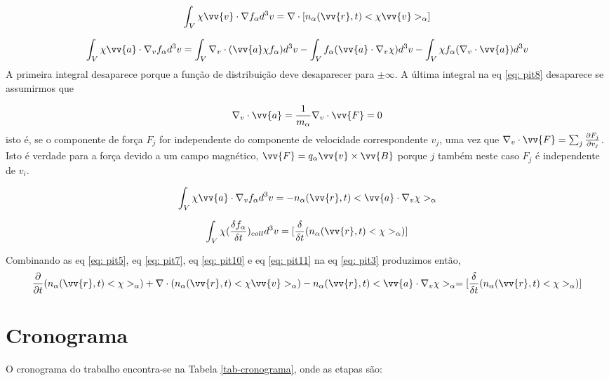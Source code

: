 \documentclass[12pt,oneside,a4paper]{abntex2}
\theoremstyle{definition}  %
\begin{document}
\begin{equation}
\label{eq: pit7}
\int_V \chi \vv{v} \cdot \nabla f_\alpha d^3 v = \nabla \cdot [n_\alpha(\vv{r},t)<\chi \vv{v}>_\alpha]
\end{equation}

\begin{equation}
\label{eq: pit8}
\int_V \chi \vv{a} \cdot \nabla_v f_\alpha d^3 v = \int_V \nabla_v \cdot (\vv{a} \chi f_\alpha)d^3 v - \int_V f_\alpha (\vv{a} \cdot \nabla_v \chi) d^3 v - \int_V \chi  f_\alpha (\nabla_v \cdot \vv{a})  d^3 v
\end{equation}
A primeira integral desaparece porque a função de distribuição deve desaparecer para $\pm \infty$. A última integral na eq \ref{eq: pit8} desaparece se assumirmos que

\begin{equation}
\label{eq: pit9}
\nabla_v \cdot \vv{a} = \frac{1}{m_\alpha} \nabla_v \cdot \vv{F} = 0
\end{equation}
isto é, se o componente de força $F_j$ for independente do componente de velocidade correspondente $v_j$, uma vez que $\nabla_v \cdot \vv{F} = \sum_j \frac{\partial F_j}{\partial v_j}$. Isto é verdade para a força devido a um campo magnético, $\vv{F} = q_\alpha \vv{v} \times \vv{B}$ porque $j$ também neste caso $F_j$ é independente de $v_i$.

\begin{equation}
\label{eq: pit10}
\int_V \chi \vv{a} \cdot \nabla_v f_\alpha d^3 v = -n_\alpha(\vv{r},t)<\vv{a} \cdot \nabla_v \chi>_\alpha
\end{equation}

\begin{equation}
\label{eq: pit11}
\int_V \chi ( \frac{\delta f_\alpha}{\delta t} )_{coll} d^3 v = [\frac{\delta}{\delta t}(n_\alpha(\vv{r},t)<\chi>_\alpha)]
\end{equation}

Combinando as eq \ref{eq: pit5}, eq \ref{eq: pit7}, eq \ref{eq: pit10} e eq \ref{eq: pit11} na eq \ref{eq: pit3} produzimos então,
\begin{equation}
\label{eq: pit12}
\frac{\partial }{\partial t}(n_\alpha(\vv{r},t)<\chi>_\alpha) + \nabla \cdot (n_\alpha(\vv{r},t)<\chi \vv{v} >_\alpha) - n_\alpha(\vv{r},t)<\vv{a} \cdot \nabla_v \chi>_\alpha = [\frac{\delta}{\delta t}(n_\alpha(\vv{r},t)<\chi>_\alpha)]
\end{equation}

\chapter{Cronograma}
O cronograma do trabalho encontra-se na Tabela \ref{tab-cronograma}, onde as etapas são:
\end{document}
